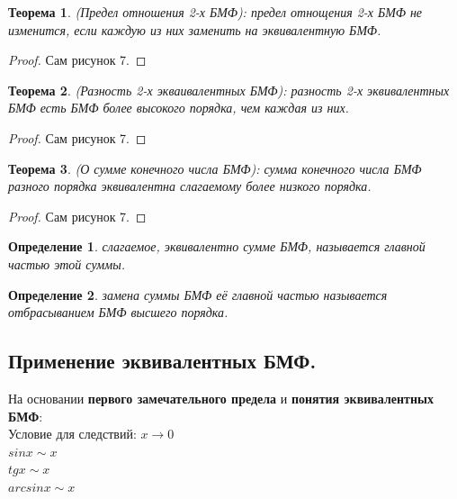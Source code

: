 \documentclass[12pt, a4paper]{article}
\newtheorem{theorem}{Теорема}[subsection]
\newtheorem{definition}{Определение}[subsection]
\theoremstyle{remark}
\begin{document}
	\begin{theorem}
		(Предел отношения 2-х БМФ): предел отнощения 2-х БМФ не изменится, если каждую из них заменить на эквивалентную БМФ.
	\end{theorem}
	
	\begin{proof}
		Сам рисунок 7.
	\end{proof}
	
	\begin{theorem}
		(Разность 2-х экваивалентных БМФ): разность 2-х эквивалентных БМФ есть БМФ более высокого порядка, чем каждая из них.
	\end{theorem}
	
	\begin{proof}
		Сам рисунок 7.
	\end{proof}
	
	\begin{theorem}
		(О сумме конечного числа БМФ): сумма конечного числа БМФ разного порядка эквивалентна слагаемому более низкого порядка.
	\end{theorem}
	
	\begin{proof}
		Сам рисунок 7.
	\end{proof}
	
	\begin{definition}
		слагаемое, эквивалентно сумме БМФ, называется главной частью этой суммы.
	\end{definition} 
	
	\begin{definition}
		замена суммы БМФ её главной частью называется отбрасыванием БМФ высшего порядка.
	\end{definition}
	
	\newpage
	
	\subsection{Применение эквивалентных БМФ.}
	
	На основании \textbf{первого замечательного предела} и \textbf{понятия эквивалентных БМФ}: \\
	
	Условие для следствий: $x \to 0$ \\
	
	$sin x \sim x$ \\
	
	$tg x \sim x$ \\
	
	$arcsin x \sim x$ \\
	
\end{document}
